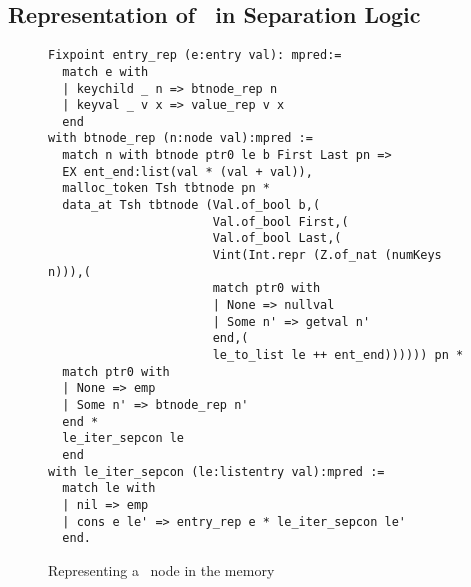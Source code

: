 \subsection{Representation of \btrees\ in Separation Logic}

\begin{figure}
\begin{lstlisting}[language=Coq]
Fixpoint entry_rep (e:entry val): mpred:=
  match e with
  | keychild _ n => btnode_rep n
  | keyval _ v x => value_rep v x
  end
with btnode_rep (n:node val):mpred :=
  match n with btnode ptr0 le b First Last pn =>
  EX ent_end:list(val * (val + val)),
  malloc_token Tsh tbtnode pn *
  data_at Tsh tbtnode (Val.of_bool b,(
                       Val.of_bool First,(
                       Val.of_bool Last,(
                       Vint(Int.repr (Z.of_nat (numKeys n))),(
                       match ptr0 with
                       | None => nullval
                       | Some n' => getval n'
                       end,(
                       le_to_list le ++ ent_end)))))) pn *
  match ptr0 with
  | None => emp
  | Some n' => btnode_rep n'
  end *
  le_iter_sepcon le
  end
with le_iter_sepcon (le:listentry val):mpred :=
  match le with
  | nil => emp
  | cons e le' => entry_rep e * le_iter_sepcon le'
  end.
\end{lstlisting}
\caption{Representing a \btree\ node in the memory}
\label{btnoderep}
\end{figure}
